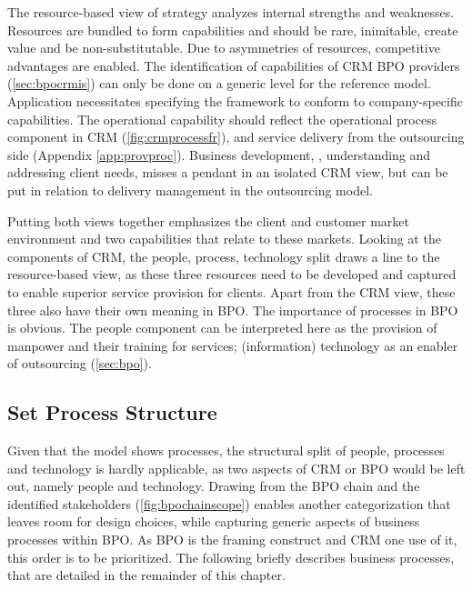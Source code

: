 	The resource-based view of strategy \citep{wernerfelt1984resource} analyzes internal strengths and weaknesses. Resources are bundled to form capabilities and should be rare, inimitable, create value and be non-substitutable. Due to asymmetries of resources, competitive advantages are enabled. The identification of capabilities of CRM BPO providers (\cf \ref{sec:bpocrmis}) can only be done on a generic level for the reference model. Application necessitates specifying the framework to conform to company-specific capabilities. The operational capability should reflect the operational process component in CRM (\cf \Fig \ref{fig:crmprocessfr}), and service delivery from the outsourcing side (\cf Appendix \ref{app:provproc}). Business development, \ie, understanding and addressing client needs, misses a pendant in an isolated CRM view, but can be put in relation to delivery management in the outsourcing model. 
	
	Putting both views together emphasizes the client and customer market environment and two capabilities that relate to these markets. %
	Looking at the components of \acrshort{CRM}, the people, process, technology split draws a line to the resource-based view, as these three resources need to be developed and captured to enable superior service provision for clients. Apart from the  \acrshort{CRM} view, these three also have their own meaning in \acrshort{BPO}. The importance of processes in  \acrshort{BPO} is obvious. The people component can be interpreted here as the provision of manpower and their training for services; (information) technology as an enabler of outsourcing (\cf \ref{sec:bpo}). 
	
		
	\subsection{Set Process Structure}
	\label{sec:procstr}
	Given that the model shows processes, the structural split of people, processes and technology is hardly applicable, as two aspects of  \acrshort{CRM} or \acrshort{BPO} would be left out, namely people and technology. Drawing from the BPO chain and the identified stakeholders (\cf \Fig \ref{fig:bpochainscope}) enables another categorization that leaves room for design choices, while capturing generic aspects of business processes within \acrshort{BPO}. As \acrshort{BPO} is the framing construct and  \acrshort{CRM} one use of it, this order is to be prioritized. The following briefly describes business processes, that are detailed in the remainder of this chapter.
	

